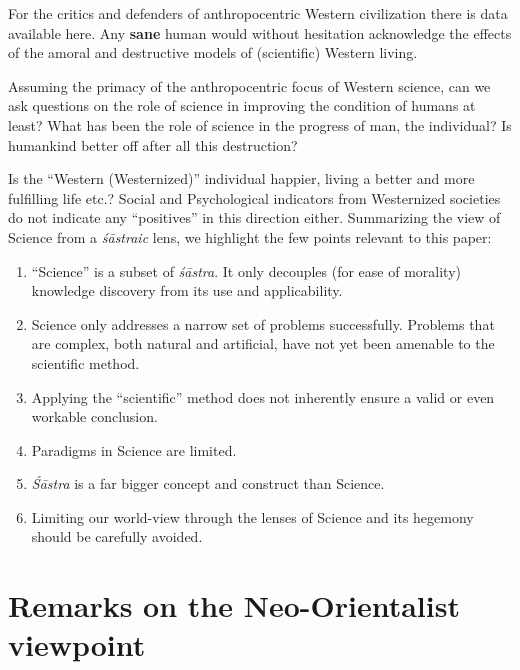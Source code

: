 For the critics and defenders of anthropocentric Western civilization there is data available here. Any \textbf{sane} human would without hesitation acknowledge the effects of the amoral and destructive models of (scientific) Western living.

Assuming the primacy of the anthropocentric focus of Western science, can we ask questions on the role of science in improving the condition of humans at least? What has been the role of science in the progress of man, the individual? Is humankind better off after all this destruction?

Is the “Western (Westernized)” individual happier, living a better and more fulfilling life etc.? Social and Psychological indicators from Westernized societies do not indicate any “positives” in this direction either. Summarizing the view of Science from a \textit{śāstraic} lens, we highlight the few points relevant to this paper:

\begin{enumerate}
\item “Science” is a subset of \textit{śāstra}. It only decouples (for ease of morality) knowledge discovery from its use and applicability. 

 \item Science only addresses a narrow set of problems successfully. Problems that are complex, both natural and artificial, have not yet been amenable to the scientific method. 

 \item Applying the “scientific” method does not inherently ensure a valid or even workable conclusion.

 \item Paradigms in Science are limited.

 \item \textit{Śāstra} is a far bigger concept and construct than Science.

 \item Limiting our world-view through the lenses of Science and its hegemony should be carefully avoided.

\end{enumerate}


\section*{Remarks on the Neo-Orientalist viewpoint}

